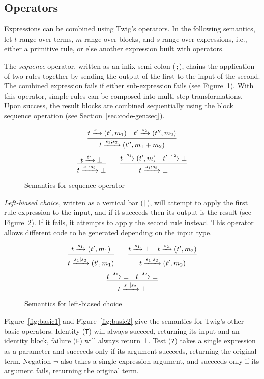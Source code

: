 
\subsection{Operators}
\label{sec:semantics:ops}

Expressions can be combined using Twig's operators. In the
following semantics, let $t$ range over terms, $m$ range over
blocks, and $s$ range over expressions, i.e., either a primitive
rule, or else another expression built with operators.

The \emph{sequence} operator, written as an infix semi-colon
(\texttt{;}), chains the application of two rules together by
sending the output of the first to the input of the second. The
combined expression fails if either sub-expression fails (see
Figure~\ref{fig:seq}). With this operator, simple rules can be
composed into multi-step transformations. Upon success, the result
blocks are combined sequentially using the block sequence
operation (see Section~\ref{sec:code-gen:seq}).

\begin{figure}[ht]
\[
\infer
  {t \arr{s_1;s_2} (t'',m_1+m_2)}
  {t \arr{s_1} (t',m_1) \quad t' \arr{s_2} (t'',m_2)}
\]
\[
\infer
  {t \arr{s_1;s_2} \bot}
  {t \arr{s_1} \bot}
\qquad
\infer
  {t \arr{s_1;s_2} \bot}
  {t \arr{s_1} (t',m) \quad t' \arr{s_2} \bot}
\]
\caption{Semantics for sequence operator}
\label{fig:seq}
\end{figure}

\emph{Left-biased choice}, written as a vertical bar (\texttt{|}),
will attempt to apply the first rule expression to the input, and
if it succeeds then its output is the result (see
Figure~\ref{fig:choice}). If it fails, it attempts to apply
the second rule instead. This operator allows different code to be
generated depending on the input type.

\begin{figure}[ht]
\[
\infer
  {t \arr{s_1|s_2} (t',m_1)}
  {t \arr{s_1} (t',m_1)}
\qquad
\infer
  {t \arr{s_1|s_2} (t',m_2)}
  {t \arr{s_1} \bot \quad t \arr{s_2} (t',m_2)}
\]
\[
\infer
  {t \arr{s_1|s_2} \bot}
  {t \arr{s_1} \bot \quad t \arr{s_2} \bot}
\]
\caption{Semantics for left-biased choice}
\label{fig:choice}
\end{figure}

Figure~\ref{fig:basic1} and Figure~\ref{fig:basic2} give the
semantics for Twig's other basic operators. Identity (\texttt{T})
will always succeed, returning its input and an identity block,
failure (\texttt{F}) will always return \texttt{$\bot$}. Test
(\texttt{?}) takes a single expression as a parameter and succeeds
only if its argument succeeds, returning the original term.
Negation \texttt{$\lnot$} also takes a single expression argument,
and succeeds only if its argument fails, returning the original
term.

